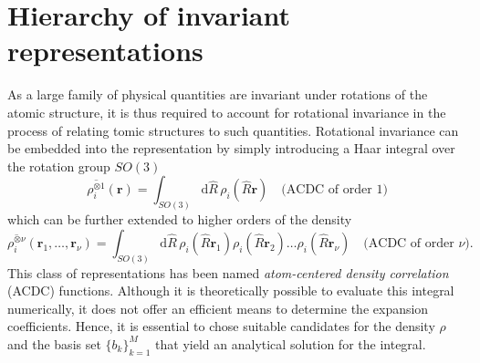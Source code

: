 \section{Hierarchy of invariant representations}
As a large family of physical quantities are invariant under rotations of the atomic structure, it is thus required to account for rotational invariance in the process of relating tomic structures to such quantities.
Rotational invariance can be embedded into the representation by simply introducing a Haar integral over the rotation group $SO(3)$
\begin{equation}
\label{eq:integration_over_subgroup}
\overline{\rho_i^{\otimes 1}}(\mathbf{r}) = \int_{SO(3)}\mathrm{d}\hat{R}\, \rho_i(\hat{R}\mathbf{r})\quad\textrm{(ACDC of order 1)}
\end{equation}
which can be further extended to higher orders of the density
\begin{equation}
\label{eq:integration_over_subgroup_higher_order}
  \overline{\rho_i^{\otimes\nu}}(\mathbf{r}_1,\ldots, \mathbf{r}_\nu) = \int_{SO(3)}\mathrm{d}\hat{R}\, \rho_i(\hat{R}\mathbf{r}_1)\rho_i(\hat{R}\mathbf{r}_2)\ldots\rho_i(\hat{R}\mathbf{r}_\nu)\quad\textrm{(ACDC of order $\nu$)}.
\end{equation}
This class of representations has been named \emph{atom-centered density correlation} (ACDC) functions\cite{nigam2022unified}.
Although it is theoretically possible to evaluate this integral numerically, it does not offer an efficient means to determine the expansion coefficients.
Hence, it is essential to chose suitable candidates for the density $\rho$ and the basis set $\{b_k\}_{k=1}^M$ that yield an analytical solution for the integral.

